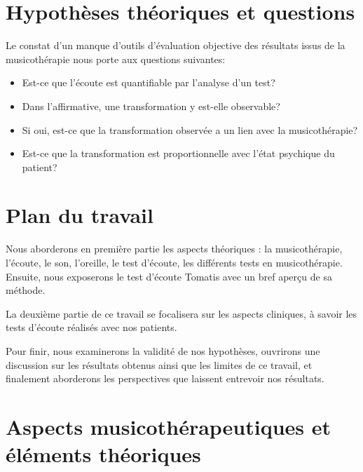 \section {Hypothèses théoriques et questions}




   Le constat d'un manque
   d'outils d'évaluation objective des résultats issus de la
   musicothérapie  nous porte aux questions
   suivantes:  
\begin{itemize}
 \item Est-ce que l'écoute est quantifiable par
          l'analyse d'un test?
        \item Dans l'affirmative,
          une transformation y est-elle observable?
        \item Si oui, est-ce que la transformation observée  a un lien
          avec la musicothérapie?
  \item Est-ce que la transformation est proportionnelle avec l'état psychique du patient?
   \end{itemize}
 

	 

\section*{Plan du travail}


Nous aborderons en première partie les aspects théoriques : la musicothérapie, l'écoute, le son, l'oreille, le 
test d'écoute, les différents tests en musicothérapie. Ensuite, nous 
exposerons le test d'écoute Tomatis avec un bref aperçu de sa méthode.

 
La deuxième partie de ce travail se focalisera sur les aspects
cliniques, à savoir les tests d'écoute réalisés  avec  nos patients. 

Pour finir, nous examinerons la validité de nos hypothèses, ouvrirons
une discussion sur les résultats obtenus ainsi que les limites de ce
travail, et finalement aborderons les perspectives que
laissent entrevoir nos résultats.



\section{{Aspects musicothérapeutiques et éléments théoriques}}


